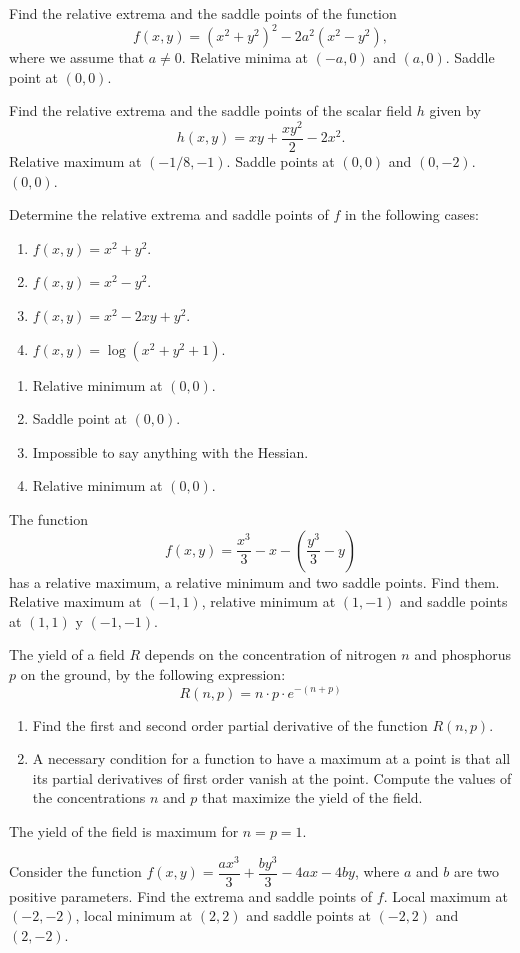 
{Find the relative extrema and the saddle points of the function
\[
f(x,y) = (x^2+y^2)^2-2a^2(x^2-y^2),
\]
where we assume that $a\neq 0$.
}
{Relative minima at $(-a,0)$ and $(a,0)$. Saddle point at $(0,0)$.
}
{
}


{Find the relative extrema and the saddle points of the scalar field $h$ given by
\[
h(x,y) = xy+\frac{xy^2}{2}-2x^2.
\]
}
{Relative maximum at $(-1/8,-1)$. Saddle points at $(0,0)$ and $(0,-2)$.
$(0,0)$.
}
{
}

{Determine the relative extrema and saddle points of $f$ in the following cases:
\begin{enumerate}
\item $f(x,y) = x^2+y^2$.
\item $f(x,y) = x^2-y^2$.
\item $f(x,y) = x^2-2xy+y^2$.
\item $f(x,y) = \log(x^2+y^2+1)$.
\end{enumerate}
}
{\begin{enumerate}
\item Relative minimum at $(0,0)$.
\item Saddle point at $(0,0)$.
\item Impossible to say anything with the Hessian.
\item Relative minimum at $(0,0)$.
\end{enumerate}
}
{
}


{The function
\[
f(x,y) = \frac{x^3}{3}-x-\left(\frac{y^3}{3}-y\right)
\]
has a relative maximum, a relative minimum and two saddle points.
Find them.
}
{Relative maximum at $(-1,1)$, relative minimum at $(1,-1)$ and saddle points at $(1,1)$ y $(-1,-1)$.
}
{
}


{The yield of a field $R$ depends on the concentration of nitrogen $n$ and phosphorus $p$ on the ground, by the following expression:
\[
R(n,p)=n\cdot p\cdot e^{-(n+p)}
\]
\begin{enumerate}
\item Find the first and second order partial derivative of the function $R(n,p)$.
\item A necessary condition for a function to have a maximum at a point is that all its partial derivatives of first order vanish at the point.
Compute the values of the concentrations $n$ and $p$ that maximize the yield of the field.
\end{enumerate}
}
{The yield of the field is maximum for $n=p=1$.
}
{
}

{Consider the function $f(x,y)=\dfrac{ax^3}{3} + \dfrac{by^3}{3}-4ax-4by$, where $a$ and $b$ are two positive parameters.
Find the extrema and saddle points of $f$.
}
{Local maximum at $(-2,-2)$, local minimum at $(2,2)$ and saddle points at $(-2,2)$ and $(2,-2)$.
}
{
}
